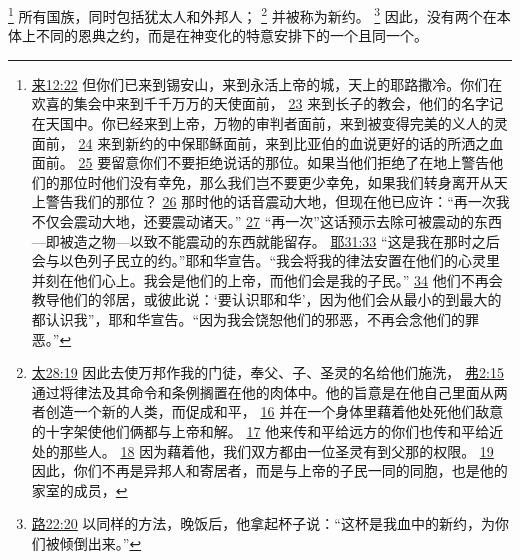 \documentclass[12pt, a4paper, oneside]{ctexart}
\begin{document}
	\footnote {
		\href{https://biblehub.com/hebrews/12-22.htm}{来12:22} 但你们已来到锡安山，来到永活上帝的城，天上的耶路撒冷。你们在欢喜的集会中来到千千万万的天使面前，
		\href{https://biblehub.com/hebrews/12-23.htm}{23} 来到长子的教会，他们的名字记在天国中。你已经来到上帝，万物的审判者面前，来到被变得完美的义人的灵面前，
		\href{https://biblehub.com/hebrews/12-24.htm}{24} 来到新约的中保耶稣面前，来到比亚伯的血说更好的话的所洒之血面前。
		\href{https://biblehub.com/hebrews/12-25.htm}{25} 要留意你们不要拒绝说话的那位。如果当他们拒绝了在地上警告他们的那位时他们没有幸免，那么我们岂不要更少幸免，如果我们转身离开从天上警告我们的那位？
		\href{https://biblehub.com/hebrews/12-26.htm}{26} 那时他的话音震动大地，但现在他已应许：“再一次我不仅会震动大地，还要震动诸天。”
		\href{https://biblehub.com/hebrews/12-27.htm}{27} “再一次”这话预示去除可被震动的东西---即被造之物---以致不能震动的东西就能留存。
		\href{https://biblehub.com/jeremiah/31-33.htm}{耶31:33} “这是我在那时之后会与以色列子民立的约。”耶和华宣告。“我会将我的律法安置在他们的心灵里并刻在他们心上。我会是他们的上帝，而他们会是我的子民。”
		\href{https://biblehub.com/jeremiah/31-34.htm}{34} 他们不再会教导他们的邻居，或彼此说：‘要认识耶和华’，因为他们会从最小的到最大的都认识我”，耶和华宣告。“因为我会饶恕他们的邪恶，不再会念他们的罪恶。”	
	}
	所有国族，同时包括犹太人和外邦人；
	\footnote {
		\href{https://biblehub.com/matthew/28-19.htm}{太28:19} 因此去使万邦作我的门徒，奉父、子、圣灵的名给他们施洗，
		\href{https://biblehub.com/ephesians/2-15.htm}{弗2:15} 通过将律法及其命令和条例搁置在他的肉体中。他的旨意是在他自己里面从两者创造一个新的人类，而促成和平，
		\href{https://biblehub.com/ephesians/2-16.htm}{16} 并在一个身体里藉着他处死他们敌意的十字架使他们俩都与上帝和解。
		\href{https://biblehub.com/ephesians/2-17.htm}{17} 他来传和平给远方的你们也传和平给近处的那些人。
		\href{https://biblehub.com/ephesians/2-18.htm}{18} 因为藉着他，我们双方都由一位圣灵有到父那的权限。
		\href{https://biblehub.com/ephesians/2-19.htm}{19} 因此，你们不再是异邦人和寄居者，而是与上帝的子民一同的同胞，也是他的家室的成员，
	}
	并被称为新约。
	\footnote {
		\href{https://biblehub.com/luke/22-20.htm}{路22:20} 以同样的方法，晚饭后，他拿起杯子说：“这杯是我血中的新约，为你们被倾倒出来。”
	}
	因此，没有两个在本体上不同的恩典之约，而是在神变化的特意安排下的一个且同一个。
\end{document}
